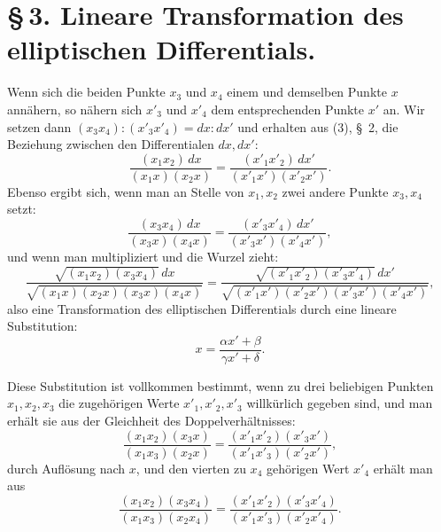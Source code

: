\documentclass[11pt]{article}
\begin{document}
\section*{\S\,3. Lineare Transformation des elliptischen Differentials.}

Wenn sich die beiden Punkte $x_3$ und $x_4$ einem und demselben Punkte $x$ annähern, so nähern sich $x'_3$ und $x'_4$ dem entsprechenden Punkte $x'$ an. Wir setzen dann $(x_3x_4):(x'_3x'_4)=dx:dx'$ und erhalten aus (3), \S~2, die Beziehung zwischen den Differentialen $dx,dx'$:
\begin{equation}
\frac{(x_1x_2)\,dx}{(x_1x)(x_2x)}=\frac{(x'_1x'_2)\,dx'}{(x'_1x')(x'_2x')}.
\tag{1}
\end{equation}
Ebenso ergibt sich, wenn man an Stelle von $x_1,x_2$ zwei andere Punkte $x_3,x_4$ setzt:
\begin{equation}
\frac{(x_3x_4)\,dx}{(x_3x)(x_4x)}=\frac{(x'_3x'_4)\,dx'}{(x'_3x')(x'_4x')},
\tag{2}
\end{equation}
und wenn man multipliziert und die Wurzel zieht:
\begin{equation}
\frac{\sqrt{(x_1x_2)(x_3x_4)}\,dx}{\sqrt{(x_1x)(x_2x)(x_3x)(x_4x)}}=
\frac{\sqrt{(x'_1x'_2)(x'_3x'_4)}\,dx'}{\sqrt{(x'_1x')(x'_2x')(x'_3x')(x'_4x')}} ,
\tag{3}
\end{equation}
also eine Transformation des elliptischen Differentials durch eine lineare Substitution:
\[
x=\frac{\alpha x'+\beta}{\gamma x'+\delta}.
\]

Diese Substitution ist vollkommen bestimmt, wenn zu drei beliebigen Punkten $x_1,x_2,x_3$ die zugehörigen Werte $x'_1,x'_2,x'_3$ willkürlich gegeben sind, und man erhält sie aus der Gleichheit des Doppelverhältnisses:
\begin{equation}
\frac{(x_1x_2)(x_3x)}{(x_1x_3)(x_2x)}=\frac{(x'_1x'_2)(x'_3x')}{(x'_1x'_3)(x'_2x')},
\tag{4}
\end{equation}
durch Auflösung nach $x$, und den vierten zu $x_4$ gehörigen Wert $x'_4$ erhält man aus
\begin{equation}
\frac{(x_1x_2)(x_3x_4)}{(x_1x_3)(x_2x_4)}=\frac{(x'_1x'_2)(x'_3x'_4)}{(x'_1x'_3)(x'_2x'_4)}.
\tag{5}
\end{equation}
\end{document}

